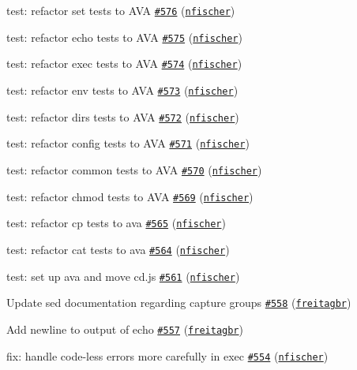 \begin{DoxyItemize}
\item test\+: refactor \textquotesingle{}set\textquotesingle{} tests to A\+VA \href{https://github.com/shelljs/shelljs/pull/576}{\tt \#576} (\href{https://github.com/nfischer}{\tt nfischer})
\item test\+: refactor echo tests to A\+VA \href{https://github.com/shelljs/shelljs/pull/575}{\tt \#575} (\href{https://github.com/nfischer}{\tt nfischer})
\item test\+: refactor exec tests to A\+VA \href{https://github.com/shelljs/shelljs/pull/574}{\tt \#574} (\href{https://github.com/nfischer}{\tt nfischer})
\item test\+: refactor env tests to A\+VA \href{https://github.com/shelljs/shelljs/pull/573}{\tt \#573} (\href{https://github.com/nfischer}{\tt nfischer})
\item test\+: refactor dirs tests to A\+VA \href{https://github.com/shelljs/shelljs/pull/572}{\tt \#572} (\href{https://github.com/nfischer}{\tt nfischer})
\item test\+: refactor config tests to A\+VA \href{https://github.com/shelljs/shelljs/pull/571}{\tt \#571} (\href{https://github.com/nfischer}{\tt nfischer})
\item test\+: refactor common tests to A\+VA \href{https://github.com/shelljs/shelljs/pull/570}{\tt \#570} (\href{https://github.com/nfischer}{\tt nfischer})
\item test\+: refactor chmod tests to A\+VA \href{https://github.com/shelljs/shelljs/pull/569}{\tt \#569} (\href{https://github.com/nfischer}{\tt nfischer})
\item test\+: refactor cp tests to ava \href{https://github.com/shelljs/shelljs/pull/565}{\tt \#565} (\href{https://github.com/nfischer}{\tt nfischer})
\item test\+: refactor cat tests to ava \href{https://github.com/shelljs/shelljs/pull/564}{\tt \#564} (\href{https://github.com/nfischer}{\tt nfischer})
\item test\+: set up ava and move cd.\+js \href{https://github.com/shelljs/shelljs/pull/561}{\tt \#561} (\href{https://github.com/nfischer}{\tt nfischer})
\item Update sed documentation regarding capture groups \href{https://github.com/shelljs/shelljs/pull/558}{\tt \#558} (\href{https://github.com/freitagbr}{\tt freitagbr})
\item Add newline to output of echo \href{https://github.com/shelljs/shelljs/pull/557}{\tt \#557} (\href{https://github.com/freitagbr}{\tt freitagbr})
\item fix\+: handle code-\/less errors more carefully in exec \href{https://github.com/shelljs/shelljs/pull/554}{\tt \#554} (\href{https://github.com/nfischer}{\tt nfischer})

\end{DoxyItemize}
